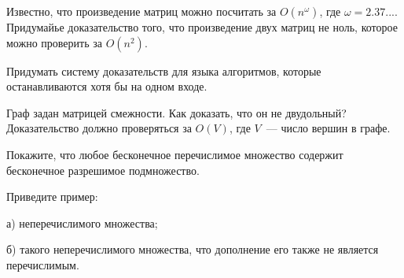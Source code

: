\setcounter{curtask}{1}



\begin{task}
    Известно, что произведение матриц можно посчитать за $O(n^{\omega})$, где $\omega
    =  2.37...$. Придумайье доказательство того, что произведение двух матриц не
    ноль, которое можно проверить за $O(n^2)$.
\end{task}

\begin{task}
	Придумать систему доказательств для языка алгоритмов, которые останавливаются
    хотя бы на одном входе.
\end{task}

\begin{task}
    Граф задан матрицей смежности. Как доказать, что он не двудольный? Доказательство
    должно проверяться за $O(V)$, где $V$~--- число вершин в графе.
\end{task}

\begin{task}
	Покажите, что любое бесконечное перечислимое множество содержит бесконечное
    разрешимое подмножество.    
\end{task}

\begin{task}
    Приведите пример:
    
    а) неперечислимого множества;

    б) такого неперечислимого множества, что дополнение его также не является
    перечислимым.
\end{task}
